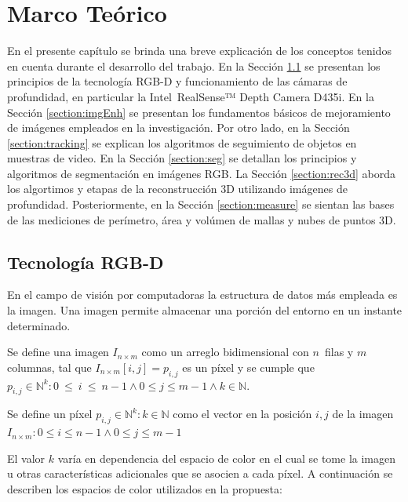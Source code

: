 \chapter{Marco Teórico}\label{chapter:theoretical-framework}


En el presente capítulo se brinda una breve explicación de los conceptos tenidos en cuenta durante el desarrollo del trabajo. En la Sección \ref{section:rgbd} se presentan los principios de la tecnología RGB-D y funcionamiento de las cámaras de profundidad, en particular la Intel~\textregistered RealSense™ Depth Camera D435i. En la Sección \ref{section:imgEnh} se presentan los fundamentos básicos de mejoramiento de imágenes empleados en la investigación. Por otro lado, en la Sección \ref{section:tracking} se explican los algoritmos de seguimiento de objetos en muestras de video. En la Sección \ref{section:seg} se detallan los principios y algoritmos de segmentación en imágenes RGB. La Sección \ref{section:rec3d} aborda los algortimos y etapas de la reconstrucción 3D utilizando imágenes de profundidad. Posteriormente, en la Sección \ref{section:measure} se sientan las bases de las mediciones de perímetro, área y volúmen de mallas y nubes de puntos 3D.

\section{Tecnología RGB-D}\label{section:rgbd}

En el campo de visión por computadoras la estructura de datos más empleada es la imagen. Una imagen permite almacenar una porción del entorno en un instante determinado.

\begin{definition}\label{def:img}
	Se define una imagen $I_{n \times m}$ como un arreglo bidimensional con $n$~filas y $m$ columnas, tal que $I_{n \times m}[i, j] = p_{i,j}$ es un píxel y se cumple que $p_{i, j} \in \mathbb{N}^k: 0~\leq~i~\leq~n -1 \wedge 0 \leq j \leq m - 1 \wedge k \in \mathbb{N}$.
\end{definition}

\begin{definition}
	Se define un píxel $p_{i, j} \in \mathbb{N}^k: k \in \mathbb{N}$ como el vector en la posición $i, j$ de la imagen $I_{n \times m}: 0 \leq i \leq n -1 \wedge 0 \leq j \leq m - 1$
\end{definition}

El valor $k$ varía en dependencia del espacio de color en el cual se tome la imagen u otras características adicionales que se asocien a cada píxel. A continuación se describen los espacios de color utilizados en la propuesta:

